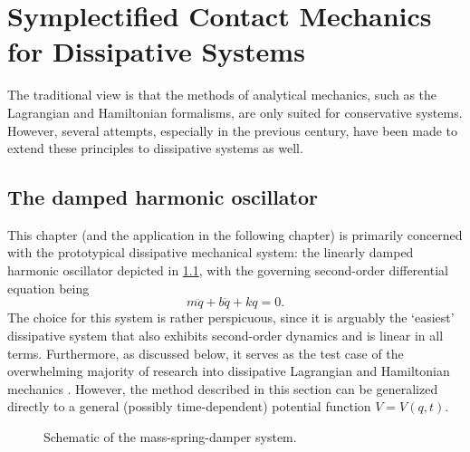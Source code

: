 \chapter{Symplectified Contact Mechanics for Dissipative Systems}
\label{chap:contact_mechanics}

The traditional view is that the methods of analytical mechanics, such as the Lagrangian and Hamiltonian formalisms, are
only suited for conservative systems. However, several attempts, especially in the previous century, have been made to
extend these principles to dissipative systems as well. 

\section{The damped harmonic oscillator}
This chapter (and the application in the following chapter) is primarily concerned with the prototypical dissipative mechanical system: the linearly damped harmonic oscillator depicted in \cref{fig:dho}, with the governing second-order differential equation being
\begin{equation}  
  m\ddot{q} + b\dot{q} + kq = 0.
\end{equation}
The choice for this system is rather perspicuous, since it is arguably the `easiest' dissipative system that also exhibits second-order dynamics and is linear in all terms. Furthermore, as discussed below, it serves as the test case of the overwhelming majority of research into dissipative Lagrangian and Hamiltonian mechanics
\cite{Dekker1981,Hutters2020b}. However, the method described in this section can be generalized directly to a general (possibly time-dependent) potential function $V = V(q, t)$.
\begin{figure}
    \begin{center}
        
    \end{center}
    \caption{Schematic of the mass-spring-damper system.}
    \label{fig:dho}
\end{figure}

